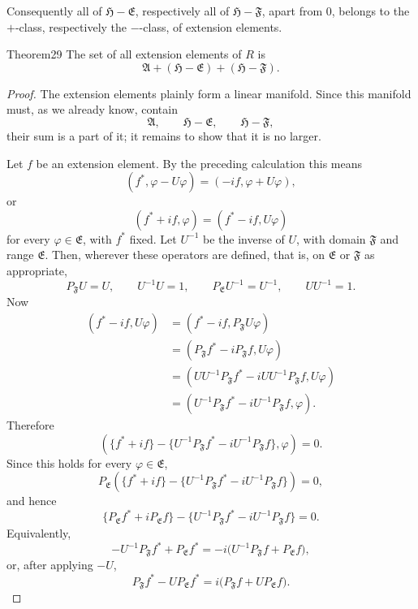 ﻿\documentclass[paper=b5,fontsize=13pt,bookmarkpackage=false,twoside]{scrartcl}
\begin{document}
Consequently all of $\mathfrak H-\mathfrak E$, respectively all of $\mathfrak H-\mathfrak F$, apart from $0$, belongs to the $+$-class, respectively the $-$-class, of extension elements.

\begin{namedstatement}{Theorem}{29}\label{thm:29}
The set of all extension elements of $R$ is
\[
\mathfrak A+(\mathfrak H-\mathfrak E)+(\mathfrak H-\mathfrak F).
\]
\end{namedstatement}

\begin{proof}
The extension elements plainly form a linear manifold. Since this manifold must, as we already know, contain
\[
\mathfrak A,\qquad \mathfrak H-\mathfrak E,\qquad
\mathfrak H-\mathfrak F,
\]
their sum is a part of it; it remains to show that it is no larger.

Let $f$ be an extension element. By the preceding calculation this means
\[
(f^*,\varphi-U\varphi)=(-if,\varphi+U\varphi),
\]
or
\[
(f^*+if,\varphi)=(f^*-if,U\varphi)
\]
for every $\varphi\in\mathfrak E$, with $f^*$ fixed. Let $U^{-1}$ be the inverse of $U$, with domain $\mathfrak F$ and range $\mathfrak E$. Then, wherever these operators are defined, that is, on $\mathfrak E$ or $\mathfrak F$ as appropriate,
\[
P_{\mathfrak F}U=U,\qquad U^{-1}U=1,
\qquad
P_{\mathfrak E}U^{-1}=U^{-1},\qquad UU^{-1}=1.
\]
Now
\begin{align*}
(f^*-if,U\varphi)
 &=(f^*-if,P_{\mathfrak F}U\varphi)\\
 &=(P_{\mathfrak F}f^*-iP_{\mathfrak F}f,U\varphi)\\
 &=(UU^{-1}P_{\mathfrak F}f^*
      -iUU^{-1}P_{\mathfrak F}f,U\varphi)\\
 &=(U^{-1}P_{\mathfrak F}f^*
      -iU^{-1}P_{\mathfrak F}f,\varphi).
\end{align*}
Therefore
\[
\left(
\{f^*+if\}
-\{U^{-1}P_{\mathfrak F}f^*
   -iU^{-1}P_{\mathfrak F}f\},
\varphi\right)=0.
\]
Since this holds for every $\varphi\in\mathfrak E$,
\[
P_{\mathfrak E}\left(
\{f^*+if\}
-\{U^{-1}P_{\mathfrak F}f^*
   -iU^{-1}P_{\mathfrak F}f\}
\right)=0,
\]
and hence
\[
\{P_{\mathfrak E}f^*+iP_{\mathfrak E}f\}
-\{U^{-1}P_{\mathfrak F}f^*
   -iU^{-1}P_{\mathfrak F}f\}=0.
\]
Equivalently,
\[
-U^{-1}P_{\mathfrak F}f^*+P_{\mathfrak E}f^*
=-i\bigl(U^{-1}P_{\mathfrak F}f+P_{\mathfrak E}f\bigr),
\]
or, after applying $-U$,
\[
P_{\mathfrak F}f^*-UP_{\mathfrak E}f^*
=i\bigl(P_{\mathfrak F}f+UP_{\mathfrak E}f\bigr).
\]


\end{proof}
\end{document}
